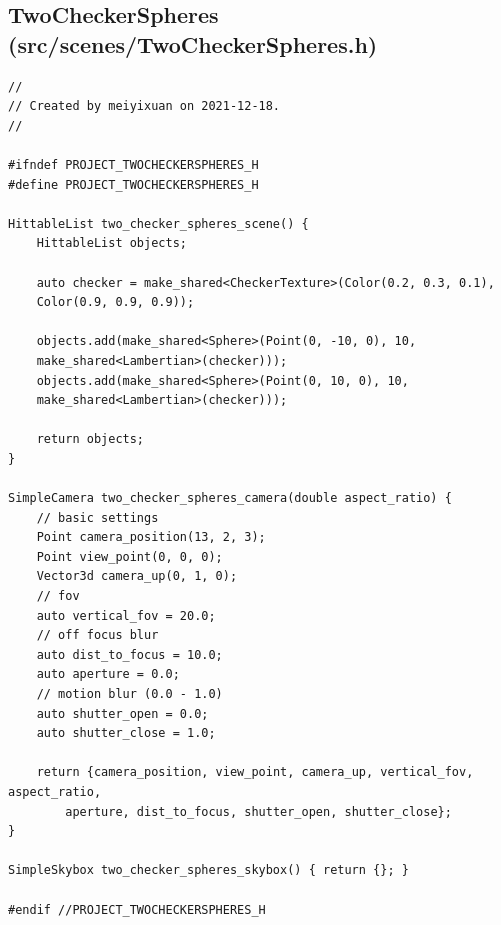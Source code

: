 \documentclass[utf8]{article}
\begin{document}
\subsection{TwoCheckerSpheres (src/scenes/TwoCheckerSpheres.h)}
\begin{lstlisting}[style=CStyle]
//
// Created by meiyixuan on 2021-12-18.
//

#ifndef PROJECT_TWOCHECKERSPHERES_H
#define PROJECT_TWOCHECKERSPHERES_H

HittableList two_checker_spheres_scene() {
	HittableList objects;
	
	auto checker = make_shared<CheckerTexture>(Color(0.2, 0.3, 0.1),
	Color(0.9, 0.9, 0.9));
	
	objects.add(make_shared<Sphere>(Point(0, -10, 0), 10,
	make_shared<Lambertian>(checker)));
	objects.add(make_shared<Sphere>(Point(0, 10, 0), 10,
	make_shared<Lambertian>(checker)));
	
	return objects;
}

SimpleCamera two_checker_spheres_camera(double aspect_ratio) {
	// basic settings
	Point camera_position(13, 2, 3);
	Point view_point(0, 0, 0);
	Vector3d camera_up(0, 1, 0);
	// fov
	auto vertical_fov = 20.0;
	// off focus blur
	auto dist_to_focus = 10.0;
	auto aperture = 0.0;
	// motion blur (0.0 - 1.0)
	auto shutter_open = 0.0;
	auto shutter_close = 1.0;
	
	return {camera_position, view_point, camera_up, vertical_fov, aspect_ratio,
		aperture, dist_to_focus, shutter_open, shutter_close};
}

SimpleSkybox two_checker_spheres_skybox() { return {}; }

#endif //PROJECT_TWOCHECKERSPHERES_H

\end{lstlisting}
\end{document}
